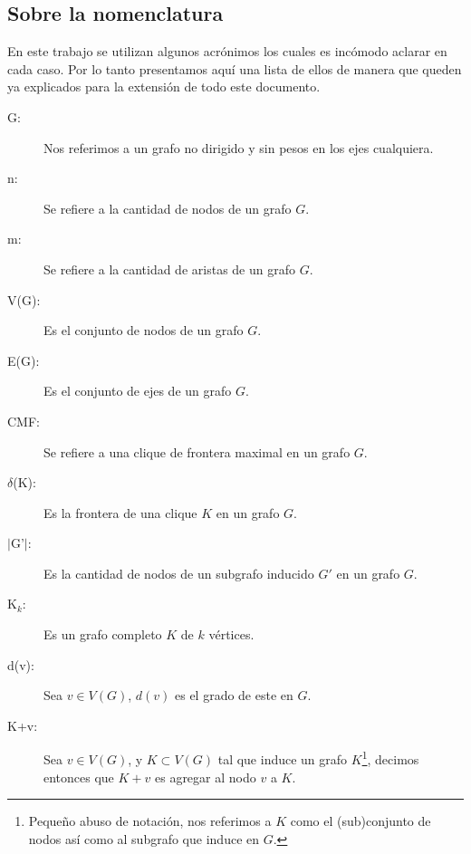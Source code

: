 \label{notas_preliminares}
{}
\subsection*{Sobre la nomenclatura}
\par En este trabajo se utilizan algunos acr\'onimos los cuales es inc\'omodo
    aclarar en cada caso. Por lo tanto presentamos aqu\'i una lista de ellos
    de manera que queden ya explicados para la extensi\'on de todo este
    documento.

\begin{description}
    \item[G: ] Nos referimos a un grafo no dirigido y sin pesos en los ejes
        cualquiera.

    \item[n: ] Se refiere a la cantidad de nodos de un grafo $G$.

    \item[m: ] Se refiere a la cantidad de aristas de un grafo $G$.

    \item[V(G): ] Es el conjunto de nodos de un grafo $G$.

    \item[E(G): ] Es el conjunto de ejes de un grafo $G$.

    \item[CMF: ] Se refiere a una clique de frontera maximal en un grafo $G$.

    \item[$\delta$(K): ] Es la frontera de una clique $K$ en un grafo $G$.

    \item[$|$G'$|$: ] Es la cantidad de nodos de un subgrafo inducido $G'$ en un grafo $G$.

    \item[K$_k$: ] Es un grafo completo $K$ de $k$ v\'ertices.

    \item[d(v): ] Sea $v \in V(G)$, $d(v)$ es el grado de este en $G$.

    \item[K+v: ] Sea $v \in V(G)$, y $K \subset V(G)$ tal que induce un grafo
        $K$\footnote{Peque\~no abuso de notaci\'on, nos referimos a $K$ como el
        (sub)conjunto de nodos as\'i como al subgrafo que induce en $G$.}, decimos
        entonces que $K+v$ es agregar al nodo $v$ a $K$.
\end{description}

